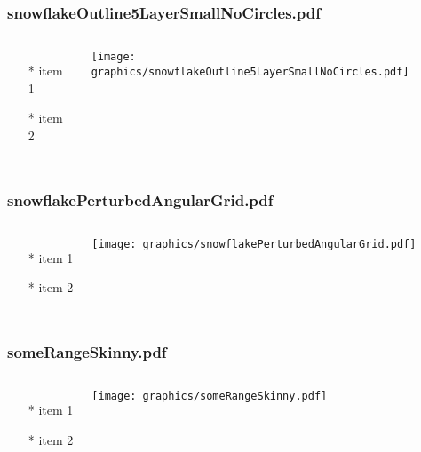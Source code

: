 \documentclass{beamer}
\begin{document}
\begin{frame} \frametitle{snowflakeOutline5LayerSmallNoCircles.pdf}
    \begin{columns}[c]
        \begin{itemize}
            \item[*] item 1
            \item[*] item 2
        \end{itemize}
        \begin{minipage}{\linewidth}
            \begin{center}
            \texttt{[image: graphics/snowflakeOutline5LayerSmallNoCircles.pdf]}
            \label{gfx:snowflakeOutline5LayerSmallNoCircles.pdf}
            \end{center}
        \end{minipage}
    \end{columns}
\end{frame}
\begin{frame} \frametitle{snowflakePerturbedAngularGrid.pdf}
    \begin{columns}[c]
        \begin{itemize}
            \item[*] item 1
            \item[*] item 2
        \end{itemize}
        \begin{minipage}{\linewidth}
            \begin{center}
            \texttt{[image: graphics/snowflakePerturbedAngularGrid.pdf]}
            \label{gfx:snowflakePerturbedAngularGrid.pdf}
            \end{center}
        \end{minipage}
    \end{columns}
\end{frame}
\begin{frame} \frametitle{someRangeSkinny.pdf}
    \begin{columns}[c]
        \begin{itemize}
            \item[*] item 1
            \item[*] item 2
        \end{itemize}
        \begin{minipage}{\linewidth}
            \begin{center}
            \texttt{[image: graphics/someRangeSkinny.pdf]}
            \label{gfx:someRangeSkinny.pdf}
            \end{center}
        \end{minipage}
    \end{columns}
\end{frame}
\end{document}
